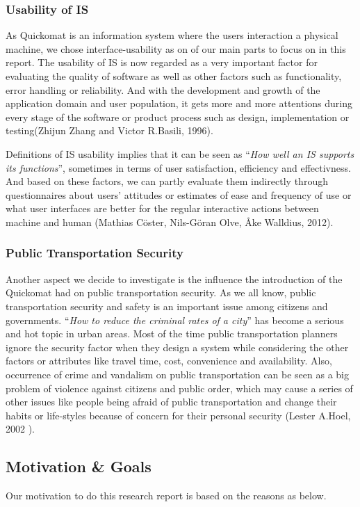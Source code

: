 \documentclass[twocolumn]{article}
\begin{document}
\subsubsection{Usability of IS}
As Quickomat is an information system where the users interaction a physical machine, we chose interface-usability as on of our main parts to focus on in this report. The usability of IS is now regarded as a very important factor for evaluating the quality of software as well as other factors such as functionality, error handling or reliability. And with the development and growth of the application domain and user population, it gets more and more attentions during every stage of the software or product process such as design, implementation or testing(Zhijun Zhang and Victor R.Basili, 1996).

Definitions of IS usability implies that it can be seen as  “\emph{How well an IS supports its functions}”, sometimes in terms of user satisfaction, efficiency and effectivness. And based on these factors, we can partly evaluate them indirectly through questionnaires about users’ attitudes or estimates of ease and frequency of use or what user interfaces are better for the regular interactive actions between machine and human (Mathias Cöster, Nils-Göran Olve, Åke Walldius, 2012).

\subsubsection{Public Transportation Security}
Another aspect we decide to investigate is the influence the introduction of the Quickomat had on public transportation security. As we all know, public transportation security and safety is an important issue among citizens and governments. “\emph{How to reduce the criminal rates of a city}” has become a serious and hot topic in urban areas. Most of the time public transportation planners ignore the security factor when they design a system while considering the other factors or attributes like travel time, cost, convenience and availability.  Also, occurrence of crime and vandalism on public transportation can be seen as a big problem of violence against citizens and public order, which may cause a series of other issues like people being afraid of public transportation and change their habits or life-styles because of concern for their personal security (Lester A.Hoel, 2002 ).

\subsection{Motivation \& Goals}
Our motivation to do this research report is based on the reasons as below.
\end{document}
